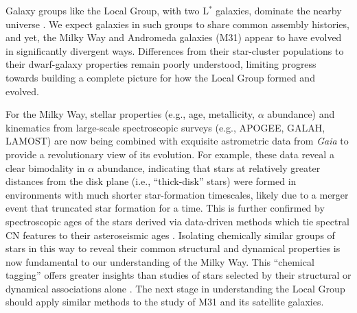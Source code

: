 \documentclass[11pt,a4paper,twoside,onecolumn,openany,final,oldfontcommands]{memoir}
\begin{document}
Galaxy groups like the Local Group, with two L$^*$ galaxies, dominate the nearby universe \citep{kourkchi17}.  We expect galaxies in such groups to share common assembly histories, and yet, the Milky Way and Andromeda galaxies (M31) appear to have evolved in significantly divergent ways.  Differences from their star-cluster populations to their dwarf-galaxy properties remain poorly understood, limiting progress towards building a complete picture for how the Local Group formed and evolved.

For the Milky Way, stellar properties (e.g., age, metallicity, $\alpha$ abundance) and kinematics from large-scale spectroscopic surveys (e.g., APOGEE, GALAH, LAMOST) are now being combined with exquisite astrometric data from \textit{Gaia} to provide a revolutionary view of its evolution.  For example, these data reveal a clear bimodality in $\alpha$ abundance, indicating that stars at relatively greater distances from the disk plane (i.e., ``thick-disk'' stars) were formed in environments with much shorter star-formation timescales, likely due to a merger event that truncated star formation for a time. This is further confirmed by spectroscopic ages of the stars derived via data-driven methods which tie spectral CN features to their asteroseismic ages \citep[e.g.][]{Martig16}.  Isolating chemically similar groups of stars in this way to reveal their common structural and dynamical properties is now fundamental to our understanding of the Milky Way.  This ``chemical tagging'' offers greater insights than studies of stars selected by their structural or dynamical associations alone \citep[e.g.,][]{Ting15}.  The next stage in understanding the Local Group should apply similar methods to the study of M31 and its satellite galaxies.
\end{document}
